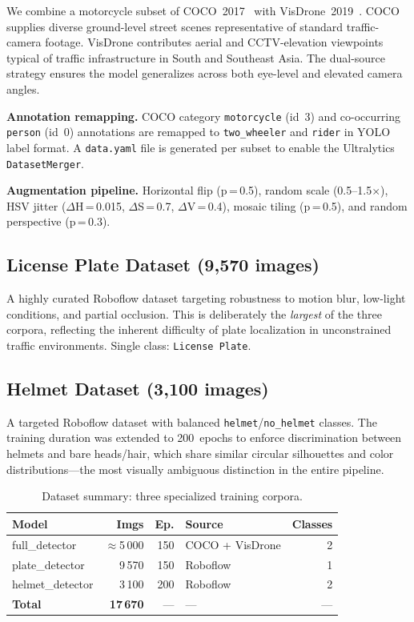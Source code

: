 \documentclass[10pt,twocolumn]{article}
\begin{document}
We combine a motorcycle subset of COCO~2017~\cite{lin2014coco} with
VisDrone~2019~\cite{zhu2018visdrone}. COCO supplies diverse ground-level
street scenes representative of standard traffic-camera footage. VisDrone
contributes aerial and CCTV-elevation viewpoints typical of traffic
infrastructure in South and Southeast Asia. The dual-source strategy ensures
the model generalizes across both eye-level and elevated camera angles.

\textbf{Annotation remapping.} COCO category \texttt{motorcycle} (id~3) and
co-occurring \texttt{person} (id~0) annotations are remapped to
\texttt{two\_wheeler} and \texttt{rider} in YOLO label format.
A \texttt{data.yaml} file is generated per subset to enable the Ultralytics
\texttt{DatasetMerger}.

\textbf{Augmentation pipeline.} Horizontal flip (p\,=\,0.5), random scale
(0.5--1.5$\times$), HSV jitter ($\Delta$H\,=\,0.015, $\Delta$S\,=\,0.7,
$\Delta$V\,=\,0.4), mosaic tiling (p\,=\,0.5), and random perspective
(p\,=\,0.3).

\subsection{License Plate Dataset (9{,}570 images)}

A highly curated Roboflow dataset targeting robustness to motion blur,
low-light conditions, and partial occlusion. This is deliberately the
\textit{largest} of the three corpora, reflecting the inherent difficulty of
plate localization in unconstrained traffic environments. Single class:
\texttt{License Plate}.

\subsection{Helmet Dataset (3{,}100 images)}

A targeted Roboflow dataset with balanced \texttt{helmet}/\texttt{no\_helmet}
classes. The training duration was extended to 200~epochs to enforce
discrimination between helmets and bare heads/hair, which share
similar circular silhouettes and color distributions---the most visually
ambiguous distinction in the entire pipeline.

\begin{table}[H]
\centering
\small
\caption{Dataset summary: three specialized training corpora.}
\label{tab:datasets}
\renewcommand{\arraystretch}{1.18}
\setlength{\tabcolsep}{4pt}
\begin{tabular}{lrrlr}
\toprule
\textbf{Model} & \textbf{Imgs} & \textbf{Ep.} & \textbf{Source} & \textbf{Classes}\\
\midrule
full\_detector   & $\approx$5\,000 & 150 & COCO + VisDrone & 2\\
plate\_detector  & 9\,570          & 150 & Roboflow        & 1\\
helmet\_detector & 3\,100          & 200 & Roboflow        & 2\\
\midrule
\textbf{Total}   & \textbf{17\,670} & --- & ---             & ---\\
\bottomrule
\end{tabular}
\end{table}
\end{document}
